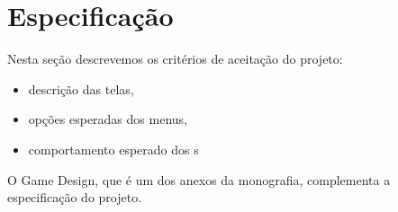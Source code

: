 \chapter{Especificação}

Nesta seção descrevemos os critérios de aceitação do projeto:
\begin{itemize}
\item descrição das telas,
\item opções esperadas dos menus,
\item comportamento esperado dos \npc{}s
\end{itemize}

O Game Design, que é um dos anexos da monografia, complementa a
especificação do projeto.

